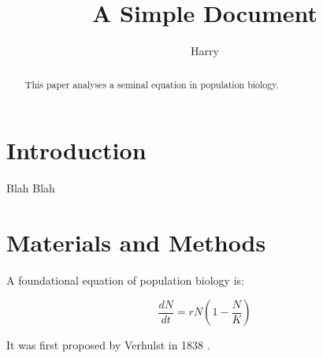 \documentclass[12pt]{article}
\title{A Simple Document}
\author{Harry}
\date{}
\begin{document}
    \maketitle
    \begin{abstract}
            This paper analyses a seminal equation in population biology.
    \end{abstract}

    \section{Introduction}
        Blah Blah
    
    \section{Materials and Methods}

    A foundational equation of population biology is:

    \begin{equation}
        \frac{dN}{dt} = r N (1 - \frac{N}{K})
    \end{equation}

    It was first proposed by Verhulst in 1838 \cite{verhulst1838notice}.

    

    
\end{document}
